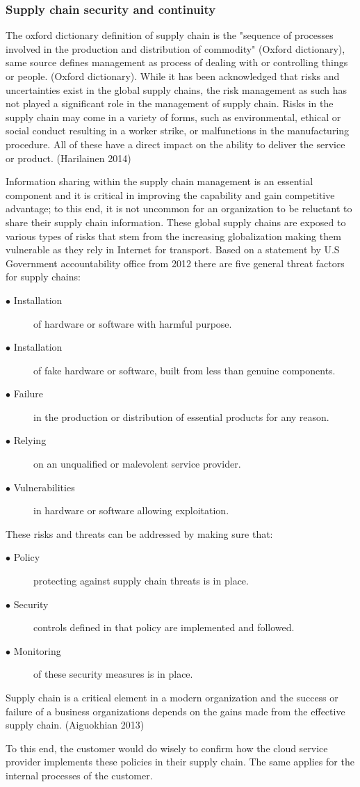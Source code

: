 \documentclass{article}
\begin{document}
\subsubsection{Supply chain security and continuity}
The oxford dictionary definition of supply chain is the "sequence of processes involved in the production and distribution of commodity" (Oxford dictionary), same source defines management as process of dealing with or controlling things or people. (Oxford dictionary). 
While it has been acknowledged that risks and uncertainties exist in the global supply chains, the risk management as such has not played a significant role in the management of supply chain. Risks in the supply chain may come in a variety of forms, such as environmental, ethical or social conduct resulting in a worker strike, or malfunctions in the manufacturing procedure. All of these have a direct impact on the ability to deliver the service or product. (Harilainen 2014)
\par
Information sharing within the supply chain management is an essential component and it is critical in improving the capability and gain competitive advantage; to this end, it is not uncommon for an organization to be reluctant to share their supply chain information. These global supply chains are exposed to various types of risks that stem from the increasing globalization making them vulnerable as they rely in Internet for transport. Based on a statement by U.S Government accountability office from 2012 there are five general threat factors for supply chains:
\begin{description}
	\item[$\bullet$ Installation] of hardware or software with harmful purpose.
	\item[$\bullet$ Installation] of fake hardware or software, built from less than genuine components.
	\item[$\bullet$ Failure] in the production or distribution of essential products for any reason.
	\item[$\bullet$ Relying] on an unqualified or malevolent service provider.
	\item[$\bullet$ Vulnerabilities] in hardware or software allowing exploitation.
\end{description}
These risks and threats can be addressed by making sure that:
\begin{description}
	\item[$\bullet$ Policy] protecting against supply chain threats is in place.
	\item[$\bullet$ Security] controls defined in that policy are implemented and followed.
	\item[$\bullet$ Monitoring] of these security measures is in place.
\end{description}
Supply chain is a critical element in a modern organization and the success or failure of a business organizations depends on the gains made from the effective supply chain. (Aiguokhian 2013)
\par
To this end, the customer would do wisely to confirm how the cloud service provider implements these policies in their supply chain. The same applies for the internal processes of the customer. 
\end{document}
